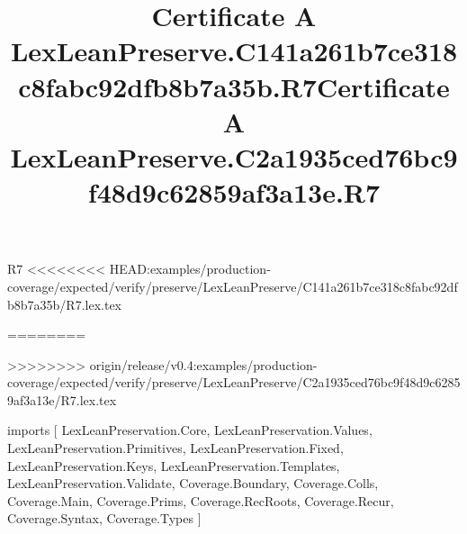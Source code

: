 \begin{lexlean}{R7}
<<<<<<<< HEAD:examples/production-coverage/expected/verify/preserve/LexLeanPreserve/C141a261b7ce318c8fabc92dfb8b7a35b/R7.lex.tex
\title{Certificate A LexLeanPreserve.C141a261b7ce318c8fabc92dfb8b7a35b.R7}
========
\title{Certificate A LexLeanPreserve.C2a1935ced76bc9f48d9c62859af3a13e.R7}
>>>>>>>> origin/release/v0.4:examples/production-coverage/expected/verify/preserve/LexLeanPreserve/C2a1935ced76bc9f48d9c62859af3a13e/R7.lex.tex
\begin{coremodule}
imports [
  LexLeanPreservation.Core,
  LexLeanPreservation.Values,
  LexLeanPreservation.Primitives,
  LexLeanPreservation.Fixed,
  LexLeanPreservation.Keys,
  LexLeanPreservation.Templates,
  LexLeanPreservation.Validate,
  Coverage.Boundary,
  Coverage.Colls,
  Coverage.Main,
  Coverage.Prims,
  Coverage.RecRoots,
  Coverage.Recur,
  Coverage.Syntax,
  Coverage.Types
]


\end{coremodule}
\end{lexlean}

